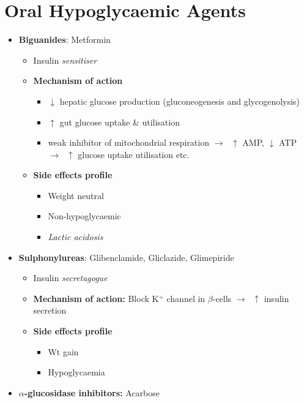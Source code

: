 \documentclass[
  12pt,
]{memoir}
\providecommand{\tightlist}{%
  \setlength{\itemsep}{0pt}\setlength{\parskip}{0pt}}
\begin{document}
\hypertarget{oral-hypoglycaemic-agents}{%
\section{Oral Hypoglycaemic Agents}\label{oral-hypoglycaemic-agents}}

\begin{itemize}
\tightlist
\item
  \textbf{Biguanides}: Metformin

  \begin{itemize}
  \tightlist
  \item
    Insulin \emph{sensitiser}
  \item
    \textbf{Mechanism of action}

    \begin{itemize}
    \tightlist
    \item
      \(\downarrow\) hepatic glucose production (gluconeogenesis and
      glycogenolysis)
    \item
      \(\uparrow\) gut glucose uptake \& utilisation
    \item
      weak inhibitor of mitochondrial respiration \(\rightarrow\;\)
      \(\uparrow\) AMP, \(\downarrow\) ATP \(\rightarrow\;\;\uparrow\)
      glucose uptake utilisation etc.
    \end{itemize}
  \item
    \textbf{Side effects profile}

    \begin{itemize}
    \tightlist
    \item
      Weight neutral
    \item
      Non-hypoglycaemic
    \item
      \emph{Lactic acidosis}
    \end{itemize}
  \end{itemize}
\item
  \textbf{Sulphonylureas}: Glibenclamide, Gliclazide, Glimepiride

  \begin{itemize}
  \tightlist
  \item
    Insulin \emph{secretagogue}
  \item
    \textbf{Mechanism of action:} Block K\(^+\) channel in
    \(\beta\)-cells \(\rightarrow\;\;\uparrow\) insulin secretion
  \item
    \textbf{Side effects profile}

    \begin{itemize}
    \tightlist
    \item
      Wt gain
    \item
      Hypoglycaemia
    \end{itemize}
  \end{itemize}
\item
  \textbf{\(\alpha\)-glucosidase inhibitors:} Acarbose


\end{itemize}
\end{document}
